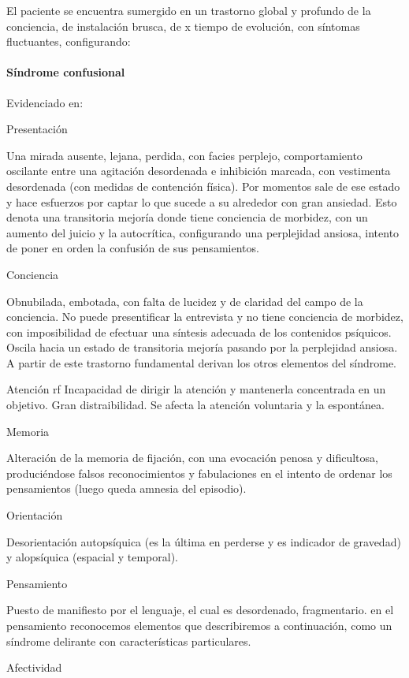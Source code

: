 \documentclass{scrbook}
\begin{document}
El paciente se encuentra sumergido en un trastorno global y profundo de la conciencia, de instalación brusca, de x tiempo de evolución, con síntomas fluctuantes, configurando:

\paragraph{Síndrome confusional}
Evidenciado en:

Presentación

Una mirada ausente, lejana, perdida, con facies perplejo, comportamiento oscilante entre una agitación desordenada e inhibición marcada, con vestimenta desordenada (con medidas de contención física). Por momentos sale de ese estado y hace esfuerzos por captar lo que sucede a su alrededor con gran ansiedad. Esto denota una transitoria mejoría donde tiene conciencia de morbidez, con un aumento del juicio y la autocrítica, configurando una perplejidad ansiosa, intento de poner en orden la confusión de sus pensamientos.

Conciencia

Obnubilada, embotada, con falta de lucidez y de claridad del campo de la conciencia. No puede presentificar la entrevista y no tiene conciencia de morbidez, con imposibilidad de efectuar una síntesis adecuada de los contenidos psíquicos. Oscila hacia un estado de transitoria mejoría pasando por la perplejidad ansiosa. A partir de este trastorno fundamental derivan los otros elementos del síndrome.

Atención
rf
Incapacidad de dirigir la atención y mantenerla concentrada en un objetivo. Gran distraibilidad. Se afecta la atención voluntaria y la espontánea.

Memoria

Alteración de la memoria de fijación, con una evocación penosa y dificultosa, produciéndose falsos reconocimientos y fabulaciones en el intento de ordenar los pensamientos (luego queda amnesia del episodio).

Orientación

Desorientación autopsíquica (es la última en perderse y es indicador de gravedad) y alopsíquica (espacial y temporal).

Pensamiento

Puesto de manifiesto por el lenguaje, el cual es desordenado, fragmentario. en el pensamiento reconocemos elementos que describiremos a continuación, como un síndrome delirante con características particulares.

Afectividad
\end{document}
